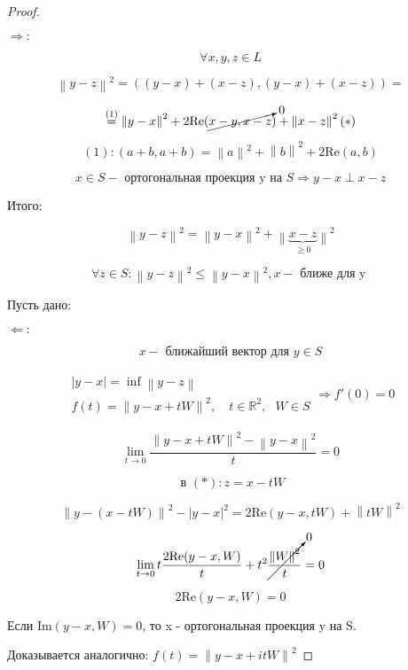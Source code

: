 \documentclass[12pt, a4paper]{report}
\begin{document}
\begin{proof}

    \[  \] 

    \( \boxed{\Rightarrow} :\) 
    
    \[ \forall  x, y , z \in  L \] 

    \[ \left\lVert  y - z  \right\rVert ^2  = ((y -x )+ (x- z ), (y -x) + ( x - z)) =   \] 
    
    \[ \overset{(1)}{=} \left\lVert y -x    \right\rVert ^2 + 2 \mathrm{Re }( \cancelto{0 }{x- y , x -z }) + \left\lVert x -z  \right\rVert ^2 (* ) \] 

    \[ (1): (a+b, a+ b )   = \left\lVert  a  \right\rVert ^2 + \left\lVert  b  \right\rVert ^2 + 2 \mathrm{Re } ( a,b ) \] 

    \[ x \in  S - \text{ ортогональная проекция y  на }  S \Rightarrow y -x \perp  x-z   \]  

    Итого: 

    \[ \left\lVert  y -z  \right\rVert ^2 = \left\lVert  y -x  \right\rVert ^2 + \underset{\geq 0 }{\left\lVert \underbrace{ x- z}  \right\rVert }^2  \] 

    \[ \forall  z \in  S : \left\lVert  y -z  \right\rVert ^2 \le  \left\lVert  y -x  \right\rVert ^2 , x - \text{ ближе для y }  \] 

    Пусть дано: 

    \( \boxed{\Leftarrow}: \) 

    \[ x - \text{ ближайший вектор для  } y \in S   \] 





    \[ \begin{aligned}
        \begin{array}{l|}
            \left\lvert y -x  \right\rvert = \inf \left\lVert  y -z \right\rVert \\
            f(t )  = \left\lVert  y -x + t W  \right\rVert ^2, \quad  t \in  \mathbb{R}  ^2 , \text{ }  W \in S
        \end{array}
        \Rightarrow f' (0 ) =0 
    \end{aligned} \] 

    \[ \lim_{t  \to 0}  \frac{ \left\lVert y -x + t W  \right\rVert ^2 - \left\lVert  y -x  \right\rVert ^2 } {t } = 0   \] 

    \[ \text{ в } (* ): z = x - t W  \]
    
    \[ \left\lVert y - (x - tW ) \right\rVert  ^2 - \left\lvert y -x  \right\rvert  ^2 = 2 \mathrm{Re } (y - x, t W ) + \left\lVert t W  \right\rVert ^2   \] 

    \[ \lim_{t  \to 0}    t\frac{2 \mathrm{Re } (y - x , W ) }{ t } + t ^2         \cancelto{0 }{ \frac{\left\lVert W  \right\rVert ^2 }{t } } = 0      \] 

    \[ 2 \mathrm{Re }  ( y - x, W )  = 0  \] 

    Если \( \mathrm{Im } ( y -x , W ) = 0 \), то x - ортогональная проекция y на S.

    Доказывается аналогично: \( f(t ) = \left\lVert y -x + i t W \right\rVert ^2 \)  

\end{proof}
\end{document}
